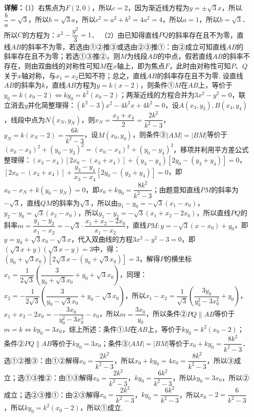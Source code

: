 \begin{question}[points=12]
\begin{solution}
\textbf{详解：}（1）右焦点为$F(2,0)$，所以$c=2$，因为渐近线方程为$y=\pm\sqrt{3}x$，所以$\dfrac{b}{a}=\sqrt{3}$，所以$b=\sqrt{3}a$，所以$c^2=a^2+b^2=4a^2=4$，所以$a=1$，所以$b=\sqrt{3}$．所以$C$的方程为：$x^2-\dfrac{y^2}{3}=1$．
（2）由已知得直线$PQ$的斜率存在且不为零，直线$AB$的斜率不为零，若选由①②推③或选由②③推①：由②成立可知直线$AB$的斜率存在且不为零；若选①③推②，则$M$为线段$AB$的中点，假若直线$AB$的斜率不存在，则由双曲线的对称性可知$M$在$x$轴上，即为焦点$F$，此时由对称性可知$P$、$Q$关于$x$轴对称，与$x_1=x_2$已知不符；总之，直线$AB$的斜率存在且不为零. 设直线$AB$的斜率为$k$，直线$AB$方程为$y=k(x-2)$，则条件①$M$在$AB$上，等价于$y_0=k(x_0-2)\Leftrightarrow ky_0=k^2(x_0-2)$；两渐近线的方程合并为$3x^2-y^2=0$，联立消去$y$并化简整理得：$(k^2-3)x^2-4k^2x+4k^2=0$，设$A(x_3,y_3),B(x_4,y_4)$，线段中点为$N(x_N,y_N)$，则$x_N=\dfrac{x_3+x_4}{2}=\dfrac{2k^2}{k^2-3}$，$y_N=k(x_N-2)=\dfrac{6k}{k^2-3}$，设$M(x_0,y_0)$，则条件③$|AM|=|BM|$等价于$(x_0-x_3)^2+(y_0-y_3)^2=(x_0-x_4)^2+(y_0-y_4)^2$，移项并利用平方差公式整理得：$(x_3-x_4)[2x_0-(x_3+x_4)]+(y_3-y_4)[2y_0-(y_3+y_4)]=0$，$[2x_0-(x_3+x_4)]+\dfrac{y_3-y_4}{x_3-x_4}[2y_0-(y_3+y_4)]=0$，即$x_0-x_N+k(y_0-y_N)=0$，即$x_0+ky_0=\dfrac{8k^2}{k^2-3}$；由题意知直线$PM$的斜率为$-\sqrt{3}$，直线$QM$的斜率为$\sqrt{3}$，所以由$y_1-y_0=-\sqrt{3}(x_1-x_0)$，$y_2-y_0=\sqrt{3}(x_2-x_0)$，所以$y_1-y_2=-\sqrt{3}(x_1+x_2-2x_0)$，所以直线$PQ$的斜率$m=\dfrac{y_1-y_2}{x_1-x_2}=-\sqrt{3}\cdot\dfrac{x_1+x_2-2x_0}{x_1-x_2}$，直线$PM: y=-\sqrt{3}(x-x_0)+y_0$，即$y=y_0+\sqrt{3}x_0-\sqrt{3}x$，代入双曲线的方程$3x^2-y^2-3=0$，即$(\sqrt{3}x+y)(\sqrt{3}x-y)=3$中，得：$(y_0+\sqrt{3}x_0)[2\sqrt{3}x-(y_0+\sqrt{3}x_0)]=3$，解得$P$的横坐标$x_1=\dfrac{1}{2\sqrt{3}}\left(\dfrac{3}{y_0+\sqrt{3}x_0}+y_0+\sqrt{3}x_0\right)$，同理：$x_2=-\dfrac{1}{2\sqrt{3}}\left(\dfrac{3}{y_0-\sqrt{3}x_0}+y_0-\sqrt{3}x_0\right)$，所以$x_1-x_2=\dfrac{1}{\sqrt{3}}\left(\dfrac{3y_0}{y_0^2-3x_0^2}+y_0\right)$，$x_1+x_2-2x_0=-\dfrac{3x_0}{y_0^2-3x_0^2}-x_0$，所以$m=\dfrac{3x_0}{y_0}$，所以条件②$PQ\parallel AB$等价于$m=k\Leftrightarrow ky_0=3x_0$，综上所述：条件①$M$在$AB$上，等价于$ky_0=k^2(x_0-2)$；条件②$PQ\parallel AB$等价于$ky_0=3x_0$；条件③$|AM|=|BM|$等价于$x_0+ky_0=\dfrac{8k^2}{k^2-3}$．选①②推③：由①②解得$x_0=\dfrac{2k^2}{k^2-3}$，所以$x_0+ky_0=4x_0=\dfrac{8k^2}{k^2-3}$，所以③成立；选①③推②：由①③解得$x_0=\dfrac{2k^2}{k^2-3}$，$ky_0=\dfrac{6k^2}{k^2-3}$，所以$ky_0=3x_0$，所以②成立；选②③推①：由②③解得$x_0=\dfrac{2k^2}{k^2-3}$，$ky_0=\dfrac{6k^2}{k^2-3}$，所以$x_0-2=\dfrac{6}{k^2-3}$，所以$ky_0=k^2(x_0-2)$，所以①成立.
\end{solution}
\end{question}

